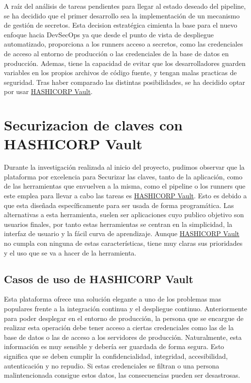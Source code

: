 \documentclass[12pt]{report} %
\begin{document}
A raíz del análisis de tareas pendientes para llegar al estado deseado del
\gls{pipeline}, se ha decidido que el primer desarrollo sea la implementación de
un mecanismo de gestión de secretos.
Esta decision estratégica cimienta la base para el nuevo enfoque hacia
\gls{DevSecOps} ya que desde el punto de vista de despliegue automatizado,
proporciona a los \gls{runner}s acceso a secretos, como las credenciales de
acceso al entorno de producción o las credenciales de la base de datos en
producción.
Ademas, tiene la capacidad de evitar que los desarrolladores guarden variables
en los propios archivos de código fuente, y tengan malas practicas de seguridad.
Tras haber comparado las distintas posibilidades, se ha decidido optar por usar
\href{https://www.hashicorp.com/products/vault}{HASHICORP Vault}.

\section{Securizacion de claves con HASHICORP Vault}

Durante la investigación realizada al inicio del proyecto, pudimos observar que
la plataforma por excelencia para Securizar las claves, tanto de la aplicación,
como de las herramientas que envuelven a la misma, como el \gls{pipeline} o los
\gls{runner}s que este emplea para llevar a cabo las tareas es 
\href{https://www.hashicorp.com/products/vault}{HASHICORP Vault}.
Esto es debido a que esta diseñada específicamente para ser usada de forma
programática.
Las alternativas a esta herramienta, suelen ser aplicaciones cuyo publico
objetivo son usuarios finales, por tanto estas herramientas se centran en la
simplicidad, la interfaz de usuario y la fácil curva de aprendizaje.
Aunque \href{https://www.hashicorp.com/products/vault}{HASHICORP Vault} no
cumpla con ninguna de estas características, tiene muy claras sus prioridades y
el uso que se va a hacer de la herramienta.

\subsection{Casos de uso de HASHICORP Vault}

Esta plataforma ofrece una solución elegante a uno de los problemas mas
populares frente a la integración continua y el despliegue continuo.
Anteriormente para poder desplegar en el entorno de producción, la persona
que se encargue de realizar esta operación debe tener acceso a ciertas credenciales
como las de la base de datos o las de acceso a los servidores de producción.
Naturalmente, esta información es muy sensible y debería ser guardada de forma
 segura.
Esto significa que se deben cumplir la confidencialidad, integridad, accesibilidad,
autenticación y no repudio.
Si estas credenciales se filtran o una persona malintencionada consigue estos
datos, las consecuencias pueden ser desastrosas.
\end{document}
